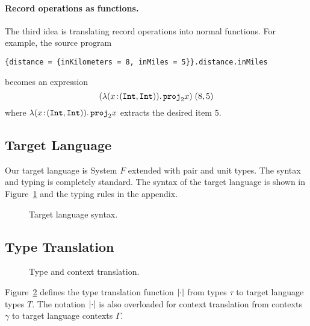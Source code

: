 \paragraph{Record operations as functions.}
The third idea is translating record operations into normal functions. For
example, the source program
\begin{lstlisting}
{distance = {inKilometers = 8, inMiles = 5}}.distance.inMiles
\end{lstlisting}
becomes an \name expression
\[
(\lambda (x \!:\! (\texttt{Int}, \texttt{Int})).\, {\texttt{proj}}_{2} x) \; (8, 5)
\]
where $\lambda (x \!:\! (\texttt{Int}, \texttt{Int})).\, {\texttt{proj}}_{2} x$
extracts the desired item $5$.

\subsection{Target Language}

Our target language is System $F$ extended with pair and unit types. The syntax
and typing is completely standard. The syntax of the target language is shown in
Figure~\ref{fig:f-syntax} and the typing rules in the appendix.
\begin{figure}[h]
  
  \caption{Target language syntax.}
  \label{fig:f-syntax}
\end{figure}



\subsection{Type Translation}

\begin{figure}[h]


\caption{Type and context translation.}
\label{fig:type-and-context-translation}
\end{figure}

Figure~\ref{fig:type-and-context-translation} defines the type translation
function $\lvert \cdot \rvert$ from \name types $\tau$ to target language types $T$. The
notation $\lvert \cdot \rvert$ is also overloaded for context translation from \name
contexts $\gamma$ to target language contexts $\Gamma$.

